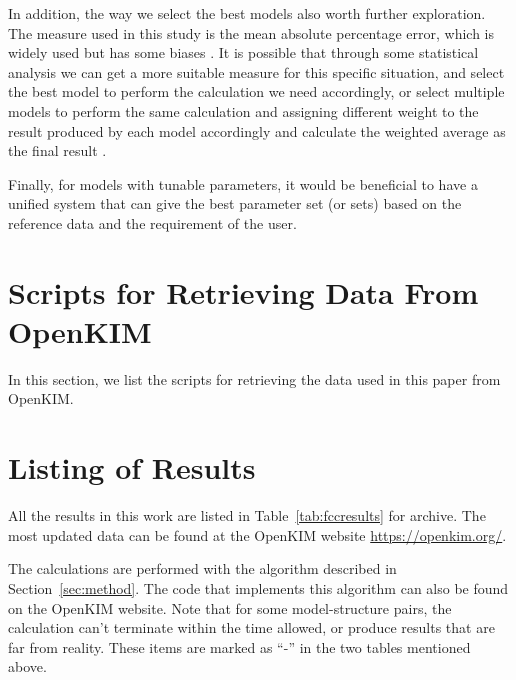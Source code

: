 \documentclass[%
 reprint,
 amsmath,amssymb,
 aps,
]{revtex4-1}
\begin{document}
In addition, the way we select the best models also worth further exploration.
The measure used in this study is the mean absolute percentage error, which is widely used but has some biases \cite{mayer1993statistical}.
It is possible that through some statistical analysis we can get a more suitable measure for this specific situation, and select the best model to perform the calculation we need accordingly, or select multiple models to perform the same calculation and assigning different weight to the result produced by each model accordingly and calculate the weighted average as the final result \cite{frederiksen2004bayesian}.

Finally, for models with tunable parameters, it would be beneficial to have a unified system that can give the best parameter set (or sets) based on the reference data and the requirement of the user.


\appendix

\section{\label{app:data}Scripts for Retrieving Data From OpenKIM}

In this section, we list the scripts for retrieving the data used in this paper from OpenKIM.

\section{\label{app:results}Listing of Results}
All the results in this work are listed in Table~\ref{tab:fccresults} for archive.
The most updated data can be found at the OpenKIM website \url{https://openkim.org/}.

The calculations are performed with the algorithm described in Section~\ref{sec:method}.
The code that implements this algorithm can also be found on the OpenKIM website.
Note that for some model-structure pairs, the calculation can't terminate within the time allowed, or produce results that are far from reality.
These items are marked as ``-'' in the two tables mentioned above.

\setlength\LTleft{0pt}
\setlength\LTright{0pt}
\setlength{\LTcapwidth}{7in}
\end{document}
